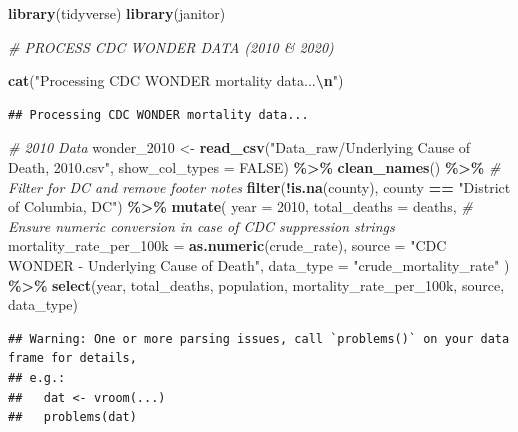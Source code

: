 \documentclass[
]{article}
\newenvironment{Shaded}{\begin{snugshade}}{\end{snugshade}}
\newcommand{\AttributeTok}[1]{\textcolor[rgb]{0.13,0.29,0.53}{#1}}
\newcommand{\CommentTok}[1]{\textcolor[rgb]{0.56,0.35,0.01}{\textit{#1}}}
\newcommand{\ConstantTok}[1]{\textcolor[rgb]{0.56,0.35,0.01}{#1}}
\newcommand{\DecValTok}[1]{\textcolor[rgb]{0.00,0.00,0.81}{#1}}
\newcommand{\FunctionTok}[1]{\textcolor[rgb]{0.13,0.29,0.53}{\textbf{#1}}}
\newcommand{\NormalTok}[1]{#1}
\newcommand{\OtherTok}[1]{\textcolor[rgb]{0.56,0.35,0.01}{#1}}
\newcommand{\SpecialCharTok}[1]{\textcolor[rgb]{0.81,0.36,0.00}{\textbf{#1}}}
\newcommand{\StringTok}[1]{\textcolor[rgb]{0.31,0.60,0.02}{#1}}
\begin{document}
\begin{Shaded}
\begin{Highlighting}[]
\FunctionTok{library}\NormalTok{(tidyverse)}
\FunctionTok{library}\NormalTok{(janitor)}


\CommentTok{\# PROCESS CDC WONDER DATA (2010 \& 2020)}

\FunctionTok{cat}\NormalTok{(}\StringTok{"Processing CDC WONDER mortality data...}\SpecialCharTok{\textbackslash{}n}\StringTok{"}\NormalTok{)}
\end{Highlighting}
\end{Shaded}

\begin{verbatim}
## Processing CDC WONDER mortality data...
\end{verbatim}

\begin{Shaded}
\begin{Highlighting}[]
\CommentTok{\# 2010 Data}
\NormalTok{wonder\_2010 }\OtherTok{\textless{}{-}} \FunctionTok{read\_csv}\NormalTok{(}\StringTok{"Data\_raw/Underlying Cause of Death, 2010.csv"}\NormalTok{, }\AttributeTok{show\_col\_types =} \ConstantTok{FALSE}\NormalTok{) }\SpecialCharTok{\%\textgreater{}\%}
  \FunctionTok{clean\_names}\NormalTok{() }\SpecialCharTok{\%\textgreater{}\%}   
  \CommentTok{\# Filter for DC and remove footer notes}
  \FunctionTok{filter}\NormalTok{(}\SpecialCharTok{!}\FunctionTok{is.na}\NormalTok{(county), county }\SpecialCharTok{==} \StringTok{"District of Columbia, DC"}\NormalTok{) }\SpecialCharTok{\%\textgreater{}\%}
  \FunctionTok{mutate}\NormalTok{(}
    \AttributeTok{year =} \DecValTok{2010}\NormalTok{,}
    \AttributeTok{total\_deaths =}\NormalTok{ deaths,}
    \CommentTok{\# Ensure numeric conversion in case of CDC suppression strings}
    \AttributeTok{mortality\_rate\_per\_100k =} \FunctionTok{as.numeric}\NormalTok{(crude\_rate),}
    \AttributeTok{source =} \StringTok{"CDC WONDER {-} Underlying Cause of Death"}\NormalTok{,}
    \AttributeTok{data\_type =} \StringTok{"crude\_mortality\_rate"}
\NormalTok{  ) }\SpecialCharTok{\%\textgreater{}\%}
  \FunctionTok{select}\NormalTok{(year, total\_deaths, population, mortality\_rate\_per\_100k, source, data\_type)}
\end{Highlighting}
\end{Shaded}

\begin{verbatim}
## Warning: One or more parsing issues, call `problems()` on your data frame for details,
## e.g.:
##   dat <- vroom(...)
##   problems(dat)
\end{verbatim}
\end{document}
